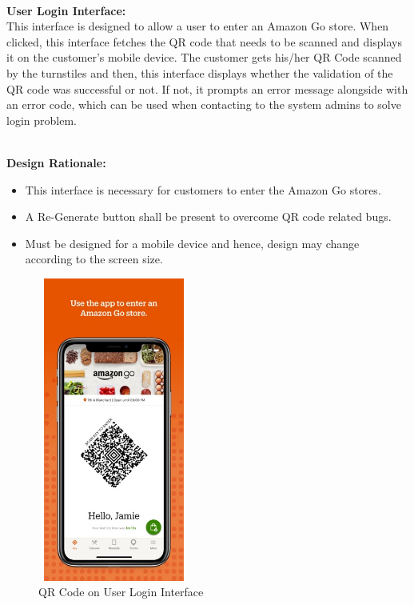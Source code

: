 \documentclass[11pt]{article}
\begin{document}
    \textbf{\\User Login Interface:\\}
    This interface is designed to allow a user to enter an Amazon Go store. When clicked, this interface fetches the QR code that needs to be scanned 
    and displays it on the customer's mobile device. The customer gets his/her QR Code scanned by the turnstiles and then, this interface displays whether the 
    validation of the QR code was successful or not. If not, it prompts an error message alongside with an error code, which can be used when contacting to the system admins 
    to solve login problem. 




    \textbf{\\Design Rationale:}
    \begin{itemize}
       \item This interface is necessary for customers to enter the Amazon Go stores.
       \item A Re-Generate button shall be present to overcome QR code related bugs.
       \item Must be designed for a mobile device and hence, design may change according to the screen size.
    \end{itemize}

    \begin{center}
        \begin{figure}[H]
            \centering
            \includegraphics[width = 5cm, height = 10cm]{Images/QRCodeScan.png}
            \caption{QR Code on User Login Interface }  
            \label{userlogininterface}
        \end{figure}
    \end{center}
    
\end{document}
